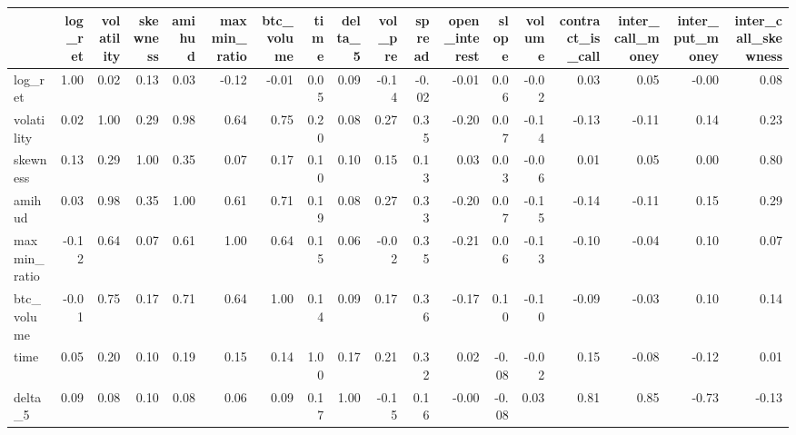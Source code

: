 \begin{tabular}{lrrrrrrrrrrrrrrrrr}
\toprule
{} &  log\_ret &  volatility &  skewness &  amihud &  maxmin\_ratio &  btc\_volume &  time &  delta\_5 &  vol\_pre &  spread &  open\_interest &  slope &  volume &  contract\_is\_call &  inter\_call\_money &  inter\_put\_money &  inter\_call\_skewness \\
\midrule
log\_ret             &     1.00 &        0.02 &      0.13 &    0.03 &         -0.12 &       -0.01 &  0.05 &     0.09 &    -0.14 &   -0.02 &          -0.01 &   0.06 &   -0.02 &              0.03 &              0.05 &            -0.00 &                 0.08 \\
volatility          &     0.02 &        1.00 &      0.29 &    0.98 &          0.64 &        0.75 &  0.20 &     0.08 &     0.27 &    0.35 &          -0.20 &   0.07 &   -0.14 &             -0.13 &             -0.11 &             0.14 &                 0.23 \\
skewness            &     0.13 &        0.29 &      1.00 &    0.35 &          0.07 &        0.17 &  0.10 &     0.10 &     0.15 &    0.13 &           0.03 &   0.03 &   -0.06 &              0.01 &              0.05 &             0.00 &                 0.80 \\
amihud              &     0.03 &        0.98 &      0.35 &    1.00 &          0.61 &        0.71 &  0.19 &     0.08 &     0.27 &    0.33 &          -0.20 &   0.07 &   -0.15 &             -0.14 &             -0.11 &             0.15 &                 0.29 \\
maxmin\_ratio        &    -0.12 &        0.64 &      0.07 &    0.61 &          1.00 &        0.64 &  0.15 &     0.06 &    -0.02 &    0.35 &          -0.21 &   0.06 &   -0.13 &             -0.10 &             -0.04 &             0.10 &                 0.07 \\
btc\_volume          &    -0.01 &        0.75 &      0.17 &    0.71 &          0.64 &        1.00 &  0.14 &     0.09 &     0.17 &    0.36 &          -0.17 &   0.10 &   -0.10 &             -0.09 &             -0.03 &             0.10 &                 0.14 \\
time                &     0.05 &        0.20 &      0.10 &    0.19 &          0.15 &        0.14 &  1.00 &     0.17 &     0.21 &    0.32 &           0.02 &  -0.08 &   -0.02 &              0.15 &             -0.08 &            -0.12 &                 0.01 \\
delta\_5             &     0.09 &        0.08 &      0.10 &    0.08 &          0.06 &        0.09 &  0.17 &     1.00 &    -0.15 &    0.16 &          -0.00 &  -0.08 &    0.03 &              0.81 &              0.85 &            -0.73 &                -0.13 \\

\end{tabular}
